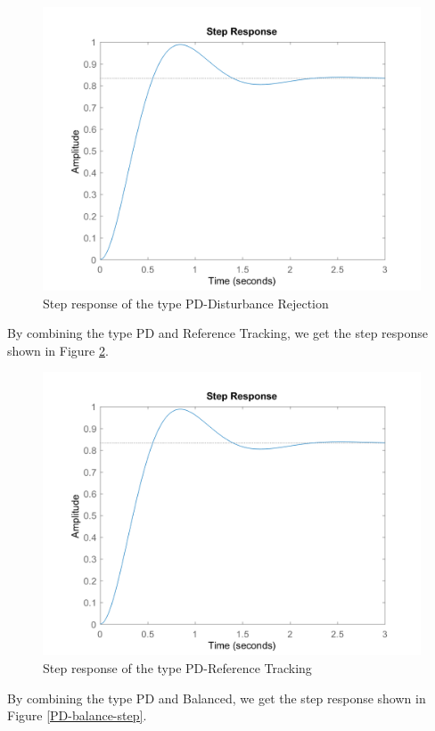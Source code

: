 \documentclass[a4paper, twocolumn, titlepage, 10pt]{article}
\begin{document}
	\begin{figure}[H]
		\centering
		\includegraphics[width=\linewidth]{PD-rej-step}
		\caption{Step response of the type PD-Disturbance Rejection}
		\label{PD-rej-step}
	\end{figure}	
								   	By combining the type PD and Reference Tracking, we get the step response shown in Figure \ref{PD-track-step}.
		\begin{figure}[H]
			\centering
			\includegraphics[width=\linewidth]{PD-track-step}
			\caption{Step response of the type PD-Reference Tracking}
			\label{PD-track-step}
		\end{figure}
						   	By combining the type PD and Balanced, we get the step response shown in Figure \ref{PD-balance-step}.
\end{document}
